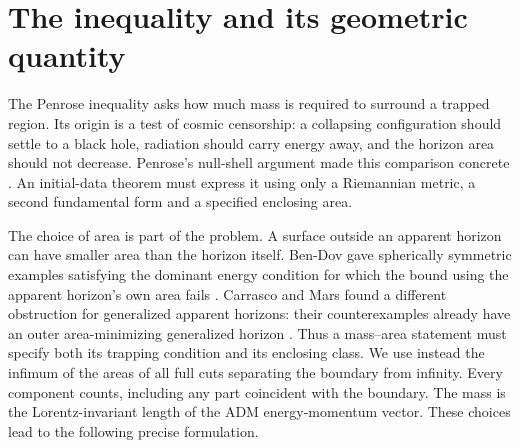 \section{The inequality and its geometric quantity}
\label{sec:introduction}
The Penrose inequality asks how much mass is required to surround a
trapped region. Its origin is a test of cosmic censorship: a collapsing
configuration should settle to a black hole, radiation should carry
energy away, and the horizon area should not decrease. Penrose's
null-shell argument made this comparison concrete \cite{Penrose1973}.
An initial-data theorem must express it using only a Riemannian metric,
a second fundamental form and a specified enclosing area.

The choice of area is part of the problem. A surface outside an apparent
horizon can have smaller area than the horizon itself. Ben-Dov gave
spherically symmetric examples satisfying the dominant energy condition
for which the bound using the apparent horizon's own area fails
\cite{BenDov2004}. Carrasco and Mars found a different obstruction
for generalized apparent horizons: their counterexamples already have
an outer area-minimizing generalized horizon \cite{CarrascoMars2010}.
Thus a mass--area statement must specify both its trapping condition
and its enclosing class. We use instead the infimum of the areas of all full cuts
separating the boundary from infinity. Every component counts, including
any part coincident with the boundary. The mass is the Lorentz-invariant
length of the ADM energy-momentum vector. These choices lead to the
following precise formulation.


